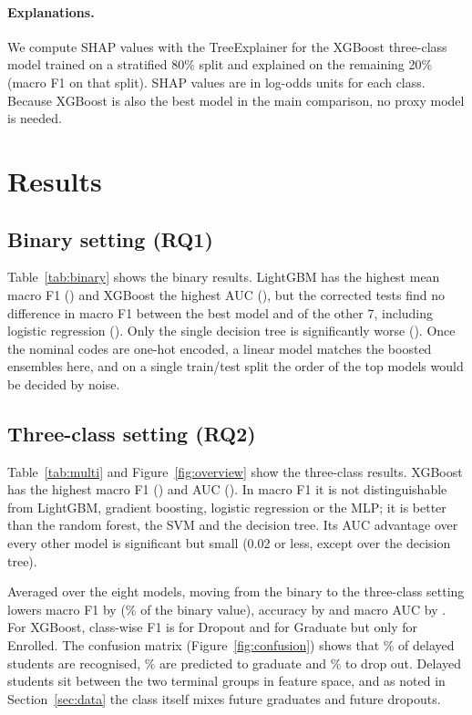 \documentclass[11pt,a4paper]{article}
\begin{document}
\paragraph{Explanations.} We compute SHAP values \citep{lundberg2017} with the TreeExplainer \citep{lundberg2020} for the XGBoost three-class model trained on a stratified 80\% split and explained on the remaining 20\% (macro F1 \shapXgbF{} on that split). SHAP values are in log-odds units for each class. Because XGBoost is also the best model in the main comparison, no proxy model is needed.

\section{Results}
\label{sec:results}

\subsection{Binary setting (RQ1)}

Table~\ref{tab:binary} shows the binary results. LightGBM has the highest mean macro F1 (\binaryLightGBMf) and XGBoost the highest AUC (\binaryXGBoostauc), but the corrected tests find no difference in macro F1 between the best model and \nTiedbinaryf{} of the other 7, including logistic regression (\binaryLogisticRegressionf). Only the single decision tree is significantly worse (\binaryDecisionTreef). Once the nominal codes are one-hot encoded, a linear model matches the boosted ensembles here, and on a single train/test split the order of the top models would be decided by noise.



\subsection{Three-class setting (RQ2)}

Table~\ref{tab:multi} and Figure~\ref{fig:overview} show the three-class results. XGBoost has the highest macro F1 (\multiclassXGBoostf) and AUC (\multiclassXGBoostauc). In macro F1 it is not distinguishable from LightGBM, gradient boosting, logistic regression or the MLP; it is better than the random forest, the SVM and the decision tree. Its AUC advantage over every other model is significant but small (0.02 or less, except over the decision tree).

Averaged over the eight models, moving from the binary to the three-class setting lowers macro F1 by \gapf{} (\gapRelf\% of the binary value), accuracy by \gapaccuracy{} and macro AUC by \gapauc. For XGBoost, class-wise F1 is \multiclassXGBoostfdropout{} for Dropout and \multiclassXGBoostfgraduate{} for Graduate but only \multiclassXGBoostfenrolled{} for Enrolled. The confusion matrix (Figure~\ref{fig:confusion}) shows that \cmEnrolledCorrect\% of delayed students are recognised, \cmEnrolledAsGrad\% are predicted to graduate and \cmEnrolledAsDrop\% to drop out. Delayed students sit between the two terminal groups in feature space, and as noted in Section~\ref{sec:data} the class itself mixes future graduates and future dropouts.
\end{document}
